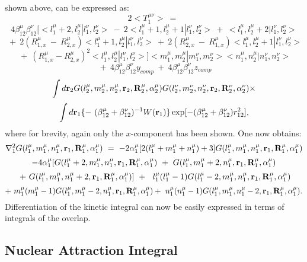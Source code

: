 shown above, can be expressed as: 
\[
2<T_1^{\mu \nu }>\ =\ 
\]
\[
4\beta _{12}^\mu \beta _{12}^\nu \bigg[
<l_1^\mu +2,l_2^\mu |l_1^\nu ,l_2^\nu >\ -\ 2<l_1^\mu +1,l_2^\mu +1|l_1^\nu
,l_2^\nu >\ +\ <l_1^\mu ,l_2^\mu +2|l_1^\nu ,l_2^\nu >
\]
\[
\ +\ 2(R_{1,x}^\mu \ -\ R_{2,x}^\mu )<l_1^\mu +1,l_2^\mu |l_1^\nu ,l_2^\nu
>\ +\ 2(R_{2,x}^\mu \ -\ R_{1,x}^\mu )<l_1^\mu ,l_2^\mu +1|l_1^\nu ,l_2^\nu >
\]
\[
\ +\ (R_{1,x}^\mu -R_{2,x}^\mu )^2<l_1^\mu ,l_2^\mu |l_1^\nu ,l_2^\nu >%
\bigg]  
<m_1^\mu ,m_2^\mu |m_1^\nu ,m_2^\nu ><n_1^\mu ,n_2^\mu |n_1^\nu ,n_2^\nu >
\]
\[
\ +\ 4\beta _{12}^\mu \beta _{12}^\nu y_{comp}\ +\ 4\beta _{12}^\mu \beta
_{12}^\nu z_{comp}
\]
\[
\int d{\bf r}_2G(l_2^\mu ,m_2^\mu ,n_2^\mu ,{\bf r}_2,{\bf R}_2^\mu ,\alpha
_2^\mu )G(l_2^\nu ,m_2^\nu ,n_2^\nu ,{\bf r}_2,{\bf R}_2^\nu ,\alpha _2^\nu
)\times 
\]
\begin{equation}
\int d{\bf r}_1\{-\ (\beta _{12}^\mu +\beta _{12}^\nu )^{-1}W({\bf r}%
_1)\}\exp [-(\beta _{12}^\mu +\beta _{12}^\nu )r_{12}^2],
\end{equation}
where for brevity, again only the $x$-component has been shown. One now
obtains: 
\[
{\nabla _1^2}G(l_1^\mu ,m_1^\mu ,n_1^\mu ,{\bf r}_1,{\bf R}_1^\mu ,\alpha
_1^\mu )\ =\ -2\alpha _1^\mu [2(l_1^\mu +m_1^\mu +n_1^\mu )+3]G(l_1^\mu
,m_1^\mu ,n_1^\mu ,{\bf r}_1,{\bf R}_1^\mu ,\alpha _1^\mu )
\]
\[
-4\alpha _1^\mu [G(l_1^\mu +2,m_1^\mu ,n_1^\mu ,{\bf r}_1,{\bf R}_1^\mu
,\alpha _1^\mu )\ +\ G(l_1^\mu ,m_1^\mu +2,n_1^\mu ,{\bf r}_1,{\bf R}_1^\mu
,\alpha _1^\mu )
\]
\[
\ +\ G(l_1^\mu ,m_1^\mu ,n_1^\mu +2,{\bf r}_1,{\bf R}_1^\mu ,\alpha _1^\mu
)]\ +\ \ l_1^\mu (l_1^\mu -1)G(l_1^\mu -2,m_1^\mu ,n_1^\mu ,{\bf r}_1,{\bf R}%
_1^\mu ,\alpha _1^\mu )
\]
\begin{equation}
+\ m_1^\mu (m_1^\mu -1)G(l_1^\mu ,m_1^\mu -2,n_1^\mu ,{\bf r}_1,{\bf R}%
_1^\mu ,\alpha _1^\mu )+\ n_1^\mu (n_1^\mu -1)G(l_1^\mu ,m_1^\mu ,n_1^\mu -2,%
{\bf r}_1,{\bf R}_1^\mu ,\alpha _1^\mu ).
\end{equation}
Differentiation of the kinetic integral can now be easily expressed in terms
of integrals of the overlap.

\subsection{Nuclear Attraction Integral}

